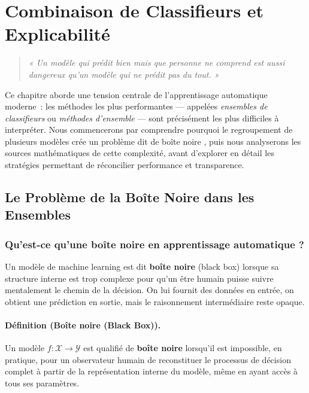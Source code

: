 \section{Combinaison de Classifieurs et Explicabilité}

\begin{quote}
\itshape
« Un modèle qui prédit bien mais que personne ne comprend est aussi dangereux qu'un modèle
qui ne prédit pas du tout. »
\end{quote}

\vspace{0.5em}

Ce chapitre aborde une tension centrale de l'apprentissage automatique moderne~: les méthodes
les plus performantes — appelées \textit{ensembles de classifieurs} ou \textit{méthodes d'ensemble}
— sont précisément les plus difficiles à interpréter. Nous commencerons par comprendre pourquoi
le regroupement de plusieurs modèles crée un problème dit de \og boîte noire \fg{}, puis nous
analyserons les sources mathématiques de cette complexité, avant d'explorer en détail les
stratégies permettant de réconcilier performance et transparence.

\subsection{Le Problème de la Boîte Noire dans les Ensembles}

\subsubsection{Qu'est-ce qu'une boîte noire en apprentissage automatique ?}

Un modèle de machine learning est dit \textbf{boîte noire} (black box) lorsque sa structure
interne est trop complexe pour qu'un être humain puisse suivre mentalement le chemin de la
décision. On lui fournit des données en entrée, on obtient une prédiction en sortie, mais le
raisonnement intermédiaire reste opaque.

\paragraph{Définition (Boîte noire (Black Box)).}
Un modèle $f : \mathcal{X} \rightarrow \mathcal{Y}$ est qualifié de \textbf{boîte noire}
lorsqu'il est impossible, en pratique, pour un observateur humain de reconstituer le processus
de décision complet à partir de la représentation interne du modèle, même en ayant accès
à tous ses paramètres.


